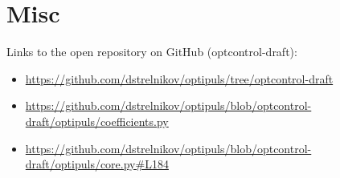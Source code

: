 \section{Misc}
Links to the open repository on GitHub (optcontrol-draft):
\begin{itemize}
	\item \url{https://github.com/dstrelnikov/optipuls/tree/optcontrol-draft}
	\item \url{https://github.com/dstrelnikov/optipuls/blob/optcontrol-draft/optipuls/coefficients.py}
	\item \url{https://github.com/dstrelnikov/optipuls/blob/optcontrol-draft/optipuls/core.py#L184}
\end{itemize}